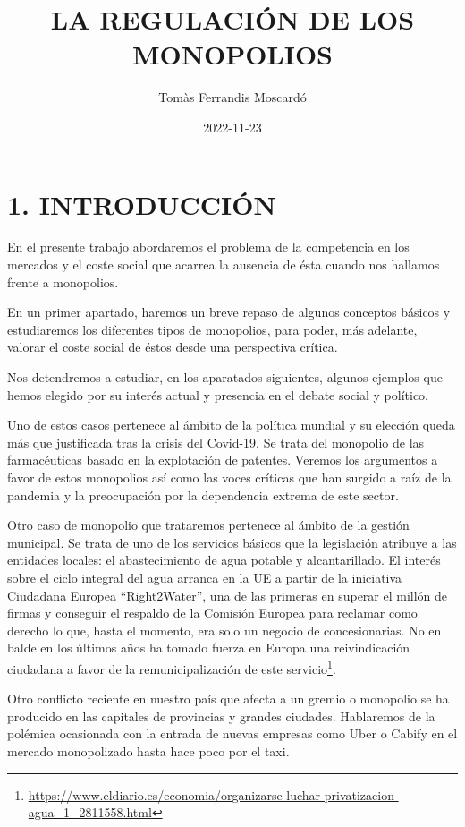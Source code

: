 \documentclass[
]{article}
\title{LA REGULACIÓN DE LOS MONOPOLIOS}
\author{Tomàs Ferrandis Moscardó}
\date{2022-11-23}
\begin{document}
\maketitle

{
\setcounter{tocdepth}{2}
\tableofcontents
}
\hypertarget{introducciuxf3n}{%
\section{1. INTRODUCCIÓN}\label{introducciuxf3n}}

En el presente trabajo abordaremos el problema de la competencia en los
mercados y el coste social que acarrea la ausencia de ésta cuando nos
hallamos frente a monopolios.

En un primer apartado, haremos un breve repaso de algunos conceptos
básicos y estudiaremos los diferentes tipos de monopolios, para poder,
más adelante, valorar el coste social de éstos desde una perspectiva
crítica.

Nos detendremos a estudiar, en los aparatados siguientes, algunos
ejemplos que hemos elegido por su interés actual y presencia en el
debate social y político.

Uno de estos casos pertenece al ámbito de la política mundial y su
elección queda más que justificada tras la crisis del Covid-19. Se trata
del monopolio de las farmacéuticas basado en la explotación de patentes.
Veremos los argumentos a favor de estos monopolios así como las voces
críticas que han surgido a raíz de la pandemia y la preocupación por la
dependencia extrema de este sector.

Otro caso de monopolio que trataremos pertenece al ámbito de la gestión
municipal. Se trata de uno de los servicios básicos que la legislación
atribuye a las entidades locales: el abastecimiento de agua potable y
alcantarillado. El interés sobre el ciclo integral del agua arranca en
la UE a partir de la iniciativa Ciudadana Europea ``Right2Water'', una
de las primeras en superar el millón de firmas y conseguir el respaldo
de la Comisión Europea para reclamar como derecho lo que, hasta el
momento, era solo un negocio de concesionarias. No en balde en los
últimos años ha tomado fuerza en Europa una reivindicación ciudadana a
favor de la remunicipalización de este servicio\footnote{\url{https://www.eldiario.es/economia/organizarse-luchar-privatizacion-agua_1_2811558.html}}.

Otro conflicto reciente en nuestro país que afecta a un gremio o
monopolio se ha producido en las capitales de provincias y grandes
ciudades. Hablaremos de la polémica ocasionada con la entrada de nuevas
empresas como Uber o Cabify en el mercado monopolizado hasta hace poco
por el taxi.
\end{document}
